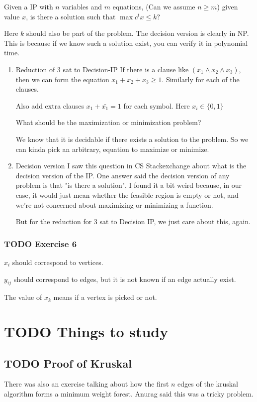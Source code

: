 \documentclass[11pt]{article}
\def\max{\operatorname{max}}
\begin{document}
Given a IP with \(n\) variables and \(m\) equations, (Can we assume \(n \ge m\))
given value \(x\), is there a solution such that \(\max c^t x \le k\)?

Here \(k\) should also be part of the problem. The decision version is clearly
in NP. This is because if we know such a solution exist, you can verify it
in polynomial time.
\begin{enumerate}
\item Reduction of 3 sat to Decision-IP
\label{sec:org73e28b8}
If there is a clause like \((x_1 \wedge x_2 \wedge x_3)\), then we can form
the equation \(x_1 + x_2 + x_3 \ge 1\). Similarly for each of the clauses.

Also add extra clauses \(x_1 + \bar{x_1} = 1\) for each symbol. Here \(x_i \in \{0, 1\}\)

What should be the maximization or minimization problem?

We know that it is decidable if there exists a solution to the problem. So
we can kinda pick an arbitrary, equation to maximize or minimize.
\item Decision version
\label{sec:org8d37d99}
I saw this question in CS Stackexchange about what is the decision version
of the IP. One answer said the decision version of any problem is that "is
there a solution", I found it a bit weird because, in our case, it would
just mean whether the feasible region is empty or not, and we're not
concerned about maximizing or minimizing a function.

But for the reduction for \(3\) sat to Decision IP, we just care about this,
again.
\end{enumerate}
\subsubsection{{\bfseries\sffamily TODO} Exercise 6}
\label{sec:org97c359c}
\(x_i\) should correspond to vertices.

\(y_{ij}\) should correspond to edges, but it is not known if an edge actually
exist.

The value of \(x_k\) means if a vertex is picked or not. 
\section{{\bfseries\sffamily TODO} Things to study}
\label{sec:org839b634}
\subsection{{\bfseries\sffamily TODO} Proof of Kruskal}
\label{sec:orgc619682}
There was also an exercise talking about how the first \(n\) edges of the
kruskal algorithm forms a minimum weight forest. Anurag said this was a
tricky problem.
\end{document}
